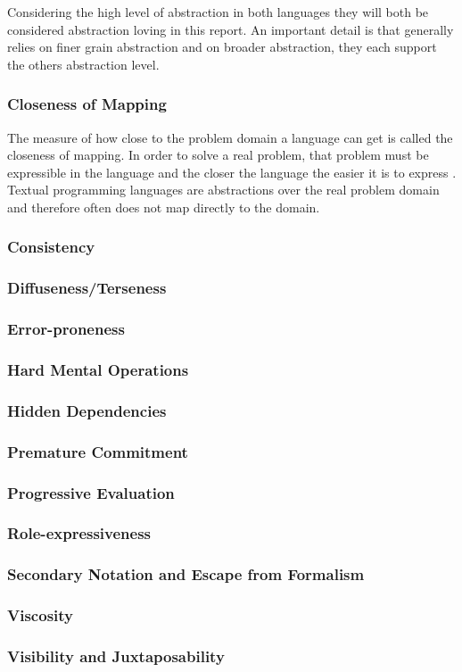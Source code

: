 Considering the high level of abstraction in both languages they will both be considered abstraction loving in this report. An important detail is that \fs generally relies on finer grain abstraction and \cs on broader abstraction, they each support the others abstraction level.

\subsubsection{Closeness of Mapping}
The measure of how close to the problem domain a language can get is called the closeness of mapping. In order to solve a real problem, that problem must be expressible in the language and the closer the language the easier it is to express \cite{green1996usability}. Textual programming languages are abstractions over the real problem domain and therefore often does not map directly to the domain.

\subsubsection{Consistency}


\subsubsection{Diffuseness/Terseness}


\subsubsection{Error-proneness}


\subsubsection{Hard Mental Operations}


\subsubsection{Hidden Dependencies}


\subsubsection{Premature Commitment}


\subsubsection{Progressive Evaluation}


\subsubsection{Role-expressiveness}


\subsubsection{Secondary Notation and Escape from Formalism}


\subsubsection{Viscosity}


\subsubsection{Visibility and Juxtaposability}
